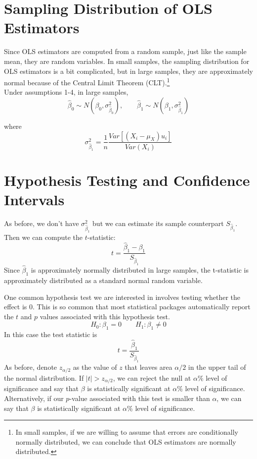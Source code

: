 \documentclass{./../../Latex/handout}
\begin{document}
 \section{Sampling Distribution of OLS Estimators}
 Since OLS estimators are computed from a random sample, just like the sample mean, they are random variables. In small samples, the sampling distribution for OLS estimators is a bit complicated, but in large samples, they are approximately normal because of the Central Limit Theorem (CLT).\footnote{In small samples, if we are willing to assume that errors are conditionally normally distributed, we can conclude that OLS estimators are normally distributed.} \\
 
 Under assumptions 1-4, in large samples, 
 $$ \hat{\beta}_0 \sim N(\beta_0, \sigma^2_{\hat{\beta}_0}), \quad \quad  \hat{\beta}_1 \sim N(\beta_1, \sigma^2_{\hat{\beta}_1}) $$
 
 where $$ \sigma^2_{\hat{\beta}_1} = \frac{1}{n} \frac{Var[(X_i-\mu_X)u_i]}{Var(X_i)} $$

 \section{Hypothesis Testing and Confidence Intervals}

As before, we don't have $\sigma^2_{\hat{\beta}_1}$ but we can estimate its sample counterpart $S_{\hat{\beta}_1}$. Then we can compute the $t$-statistic: 
$$ t = \frac{\hat{\beta}_1-\beta_1}{S_{\hat{\beta}_1}}  $$
Since $ \hat{\beta}_1$ is approximately normally distributed in large samples, the t-statistic is approximately distributed as a standard normal random variable.

One common hypothesis test we are interested in involves testing whether the effect is 0. This is so common that most statistical packages automatically report the $t$ and $p$ values associated with this hypothesis test. 
$$ H_0: \beta_1 = 0 \quad \quad H_1: \beta_1 \neq 0 $$
In this case the test statistic is 
$$ t = \frac{\hat{\beta}_1}{S_{\hat{\beta}_1}} $$
As before, denote $z_{\alpha/2}$ as the value of $z$ that leaves area $\alpha/2$ in the upper tail of the normal distribution. If $|t|>z_{\alpha/2}$, we can reject the null at $\alpha$\% level of significance and say that $\beta$ is statistically significant at $\alpha$\% level of significance. Alternatively, if our $p$-value associated with this test is smaller than $\alpha$, we can say that $\beta$ is statistically significant at $\alpha$\% level of significance. \\
\end{document}
